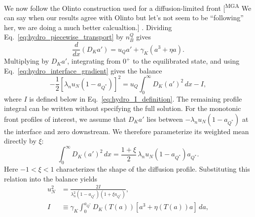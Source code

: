\documentclass[10pt,superscriptaddress,
amsmath,aps,prc,twocolumn,nofootinbib,floatfix]{revtex4-1}
\newcommand{\mgacom}[1]{\textsf{\color[rgb]{0.7,0,0}[\textsuperscript{MGA} #1]}}
\newcommand{\Qstar}{\ensuremath{Q^*}}
\newcommand{\Bratio}{\lambda_n}
\begin{document}
We now follow the Olinto construction used for a diffusion-limited front 
\mgacom{We can say when our results agree with Olinto but let's not seem to be ``following'' her, we are doing a much better calcualtion.} \cite{Olinto:1986je}.  Dividing Eq.~\eqref{eq:hydro_piecewise_transport} by $n_B^Q$ gives
\begin{equation*}
 \frac{d}{dx}\left(D_Ka'\right)
 =u_Qa'+\gamma_K\left(a^3+\eta a\right).
\end{equation*}
Multiplying by $D_Ka'$, integrating from $0^+$ to the equilibrated state, and using Eq.~\eqref{eq:hydro_interface_gradient} gives the balance
\begin{equation*}
 -\frac{1}{2}
 \left[\Bratio u_N(1-a_{\Qstar})\right]^2
 =
 u_Q\int_0^\infty D_K(a')^2\,dx-I,
\end{equation*}
where $I$ is defined below in Eq.~\eqref{eq:hydro_I_definition}.
The remaining profile integral can be written without specifying the full solution.  
For the monotonic front profiles of interest, we assume that $D_Ka'$ lies between $-\Bratio u_N(1-a_{\Qstar})$ at the interface and zero downstream.  %
We therefore parameterize its weighted mean directly by
$\xi$:
\begin{equation*}
 \int_0^\infty D_K(a')^2\,dx
 =
 \frac{1+\xi}{2}\,
 \Bratio u_N(1-a_{\Qstar})a_{\Qstar}.
\end{equation*}
Here $-1<\xi<1$ characterizes the shape of the diffusion profile. 
Substituting this relation into the balance yields
\begin{align}
 u_N^2&=
 \frac{2I}
 {\Bratio^2(1-a_{\Qstar})(1+\xi a_{\Qstar})},
\label{eq:hydro_speed_general}\\
 I&\equiv
 \gamma_K\int_0^{a_{\Qstar}}
 D_K(T(a))\left[a^3+\eta(T(a))a\right]\,da,
\label{eq:hydro_I_definition}
\end{align}
\end{document}

